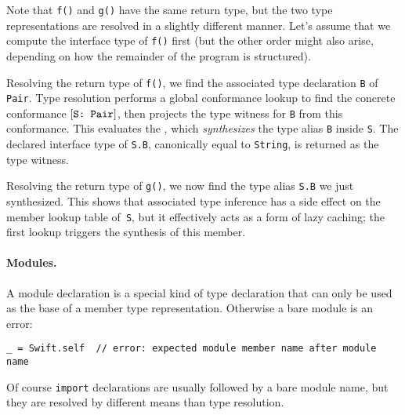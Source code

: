 \documentclass[../generics]{subfiles}
\begin{document}
Note that \texttt{f()} and \texttt{g()} have the same return type, but the two type representations are resolved in a slightly different manner. Let's assume that we compute the interface type of \texttt{f()} first (but the other order might also arise, depending on how the remainder of the program is structured).

Resolving the return type of \texttt{f()}, we find the associated type declaration \texttt{B} of \texttt{Pair}. Type resolution performs a global conformance lookup to find the concrete conformance $[\texttt{S:~Pair}]$, then projects the type witness for \texttt{B} from this conformance. This evaluates the , which \emph{synthesizes} the type alias \texttt{B} inside \texttt{S}. The declared interface type of \texttt{S.B}, canonically equal to \texttt{String}, is returned as the type witness.

Resolving the return type of \texttt{g()}, we now find the type alias \texttt{S.B} we just synthesized. This shows that associated type inference has a side effect on the member lookup table of~\texttt{S}, but it effectively acts as a form of lazy caching; the first lookup triggers the synthesis of this member.

\paragraph{Modules.}
A module declaration is a special kind of type declaration that can only be used as the base of a member type representation. Otherwise a bare module is an error:
\begin{Verbatim}
_ = Swift.self  // error: expected module member name after module name
\end{Verbatim}
Of course \texttt{import} declarations are usually followed by a bare module name, but they are resolved by different means than type resolution.
\end{document}

